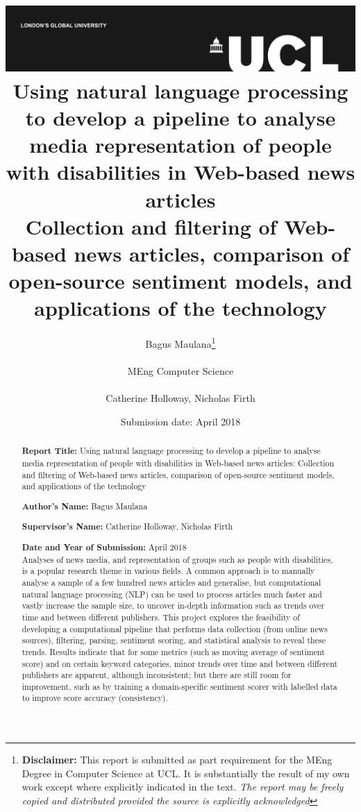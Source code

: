 \documentclass{report}
\title{{\vspace{-14em} \includegraphics[scale=0.4]{ucl_logo.png}}\\
{{\Huge Using natural language processing to develop a pipeline to analyse media representation of people with disabilities in Web-based news articles}}\\
{\large Collection and filtering of Web-based news articles, comparison of open-source sentiment models, and applications of the technology
}\\
}
\date{Submission date: \nth{30} April 2018}
\author{Bagus Maulana\thanks{
{\bf Disclaimer:}
This report is submitted as part requirement for the MEng Degree in Computer Science at UCL. It is
substantially the result of my own work except where explicitly indicated in the text.
\emph{The report may be freely copied and distributed provided the source is explicitly acknowledged}}
\\ \\
MEng Computer Science\\ \\
Catherine Holloway, Nicholas Firth}
\begin{document}
 
\onehalfspacing
\maketitle
\begin{abstract}

\textbf{Report Title:}  Using natural language processing to develop a pipeline to analyse media representation of people with disabilities in Web-based news articles: Collection and filtering of Web-based news articles, comparison of open-source sentiment models, and applications of the technology

\textbf{Author’s Name:} Bagus Maulana

\textbf{Supervisor’s Name:} Catherine Holloway, Nicholas Firth

\textbf{Date and Year of Submission:}  April 2018\\

Analyses of news media, and representation of groups such as people with disabilities, is a popular research theme in various fields. A common approach is to manually analyse a sample of a few hundred news articles and generalise, but computational natural language processing (NLP) can be used to process articles much faster and vastly increase the sample size, to uncover in-depth information such as trends over time and between different publishers. This project explores the feasibility of developing a computational pipeline that performs data collection (from online news sources), filtering, parsing, sentiment scoring, and statistical analysis to reveal these trends. Results indicate that for some metrics (such as moving average of sentiment score) and on certain keyword categories, minor trends over time and between different publishers are apparent, although inconsistent; but there are still room for improvement, such as by training a domain-specific sentiment scorer with labelled data to improve score accuracy (consistency).





\end{abstract}
\tableofcontents
\setcounter{page}{1}
\end{document}

